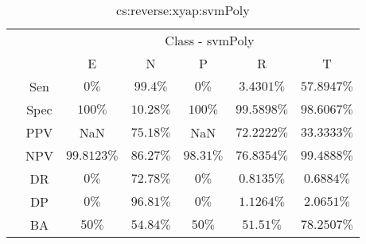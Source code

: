 \begin{table}[!ht]
	\centering
	\begin{tabular}{|c|c|c|c|c|c|c|}
		\cline{3-7}
		\multicolumn{2}{c|}{} & \multicolumn{5}{c|}{Class - svmPoly} \\ \cline{3-7}
		\multicolumn{2}{c|}{} & E & N & P & R & T \\ \hline
		\multirow{7}{*}{\rotatebox{90}{Statistics}} & Sen & $0\%$ & $99.4\%$ & $0\%$ & $3.4301\%$ & $57.8947\%$ \\ \cline{2-7}
		 & Spec & $100\%$ & $10.28\%$ & $100\%$ & $99.5898\%$ & $98.6067\%$ \\ \cline{2-7}
		 & PPV & NaN & $75.18\%$ & NaN & $72.2222\%$ & $33.3333\%$ \\ \cline{2-7}
		 & NPV & $99.8123\%$ & $86.27\%$ & $98.31\%$ & $76.8354\%$ & $99.4888\%$ \\ \cline{2-7}
		 & DR & $0\%$ & $72.78\%$ & $0\%$ & $0.8135\%$ & $0.6884\%$ \\ \cline{2-7}
		 & DP & $0\%$ & $96.81\%$ & $0\%$ & $1.1264\%$ & $2.0651\%$ \\ \cline{2-7}
		 & BA & $50\%$ & $54.84\%$ & $50\%$ & $51.51\%$ & $78.2507\%$ \\ \hline
	\end{tabular}
	\caption{cs:reverse:xyap:svmPoly}
	\label{tab:cs:reverse:xyap:svmPoly}
\end{table}
